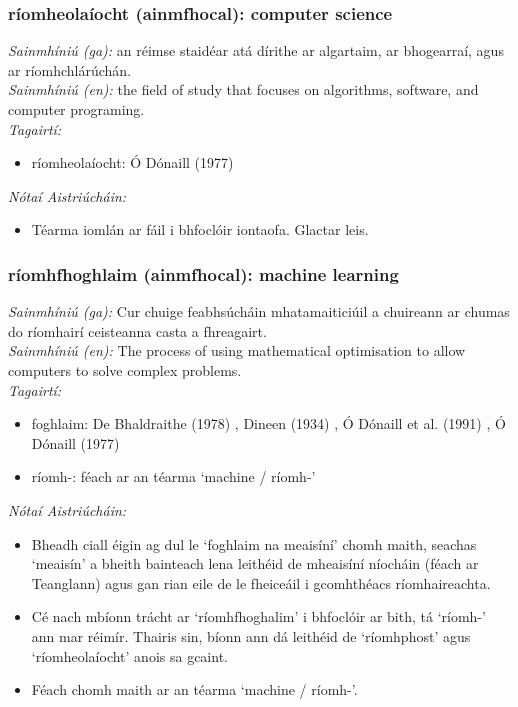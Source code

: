 \subsubsection*{ríomheolaíocht (ainmfhocal): computer science}
 \noindent \textit{Sainmhíniú (ga):} an réimse staidéar atá dírithe ar algartaim, ar bhogearraí, agus ar ríomhchlárúchán.
\\
 \noindent \textit{Sainmhíniú (en):} the field of study that focuses on algorithms, software, and computer programing.
\\
 \noindent \textit{Tagairtí:}
\begin{itemize}
	\item ríomheolaíocht: Ó Dónaill (1977) \cite{odonaill}
\end{itemize}

 \noindent \textit{Nótaí Aistriúcháin:}
\begin{itemize}
	\item Téarma iomlán ar fáil i bhfoclóir iontaofa. Glactar leis.
\end{itemize}


\subsubsection*{ríomhfhoghlaim (ainmfhocal): machine learning}
 \noindent \textit{Sainmhíniú (ga):} Cur chuige feabhsúcháin mhatamaiticiúil a chuireann ar chumas do ríomhairí ceisteanna casta a fhreagairt.
\\
 \noindent \textit{Sainmhíniú (en):} The process of using mathematical optimisation to allow computers to solve complex problems.
\\
 \noindent \textit{Tagairtí:}
\begin{itemize}
	\item foghlaim: De Bhaldraithe (1978) \cite{de-bhaldraithe}, Dineen (1934) \cite{dineen}, Ó Dónaill et al. (1991) \cite{focloir-beag}, Ó Dónaill (1977) \cite{odonaill}
	\item ríomh-: féach ar an téarma `machine / ríomh-'
\end{itemize}

 \noindent \textit{Nótaí Aistriúcháin:}
\begin{itemize}
	\item Bheadh ciall éigin ag dul le `foghlaim na meaisíní' chomh maith, seachas `meaisín' a bheith bainteach lena leithéid de mheaisíní níocháin (féach ar Teanglann) agus gan rian eile de le fheiceáil i gcomhthéacs ríomhaireachta.
	\item Cé nach mbíonn trácht ar `ríomhfhoghalim' i bhfoclóir ar bith, tá `ríomh-' ann mar réimír. Thairis sin, bíonn ann dá leithéid de `ríomhphost' agus `ríomheolaíocht' anois sa gcaint.
	\item Féach chomh maith ar an téarma `machine / ríomh-'.
\end{itemize}


